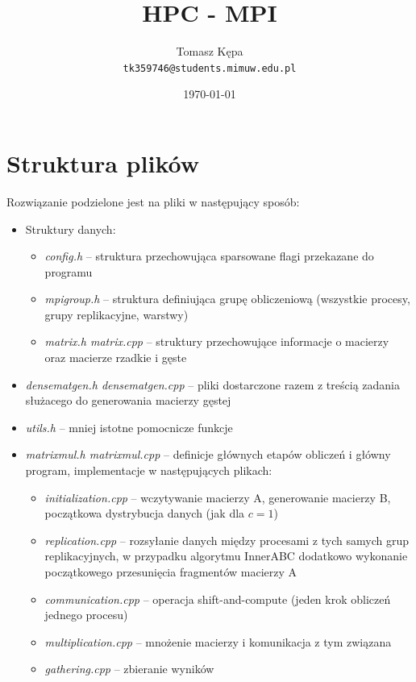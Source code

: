 \documentclass{article}
\date\today
\title{HPC - MPI}
\author{Tomasz Kępa \\ \texttt{tk359746@students.mimuw.edu.pl}}
\begin{document}
\maketitle


\section{Struktura plików}
Rozwiązanie podzielone jest na pliki w następujący sposób:
\begin{itemize}
  \item Struktury danych:
    \begin{itemize}
       \item \emph{config.h} -- struktura przechowująca sparsowane flagi przekazane do programu
       \item \emph{mpigroup.h} -- struktura definiująca grupę obliczeniową (wszystkie procesy, grupy replikacyjne, warstwy)
       \item \emph{matrix.h matrix.cpp} -- struktury przechowujące informacje o macierzy oraz macierze rzadkie i gęste
    \end{itemize}
  \item \emph{densematgen.h densematgen.cpp} -- pliki dostarczone razem z treścią zadania służacego do generowania macierzy gęstej
  \item \emph{utils.h} -- mniej istotne pomocnicze funkcje
  \item \emph{matrixmul.h matrixmul.cpp} -- definicje głównych etapów obliczeń i główny program, implementacje w następujących plikach:
    \begin{itemize}
      \item \emph{initialization.cpp} -- wczytywanie macierzy A, generowanie macierzy B, początkowa dystrybucja danych (jak dla $c=1$)
      \item \emph{replication.cpp} -- rozsyłanie danych między procesami z tych samych grup replikacyjnych, w przypadku algorytmu InnerABC
                                                         dodatkowo wykonanie początkowego przesunięcia fragmentów macierzy A
      \item \emph{communication.cpp} -- operacja shift-and-compute (jeden krok obliczeń jednego procesu)
      \item \emph{multiplication.cpp} -- mnożenie macierzy i komunikacja z tym związana
      \item \emph{gathering.cpp} -- zbieranie wyników
    \end{itemize}
\end{itemize}
\end{document}
